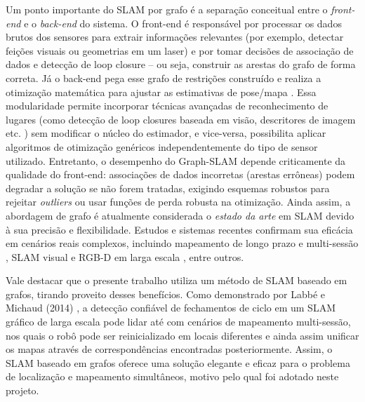         Um ponto importante do SLAM por grafo é a separação conceitual entre o \textit{front-end} e o \textit{back-end} do sistema. O front-end é responsável por processar os dados brutos dos sensores para extrair informações relevantes (por exemplo, detectar feições visuais ou geometrias em um laser) e por tomar decisões de associação de dados e detecção de loop closure – ou seja, construir as arestas do grafo de forma correta. Já o back-end pega esse grafo de restrições construído e realiza a otimização matemática para ajustar as estimativas de pose/mapa \cite{Cadena2016}. Essa modularidade permite incorporar técnicas avançadas de reconhecimento de lugares (como detecção de loop closures baseada em visão, descritores de imagem etc. \cite{Labbe2014}) sem modificar o núcleo do estimador, e vice-versa, possibilita aplicar algoritmos de otimização genéricos independentemente do tipo de sensor utilizado. Entretanto, o desempenho do Graph-SLAM depende criticamente da qualidade do front-end: associações de dados incorretas (arestas errôneas) podem degradar a solução se não forem tratadas, exigindo esquemas robustos para rejeitar \textit{outliers} ou usar funções de perda robusta na otimização. Ainda assim, a abordagem de grafo é atualmente considerada o \textit{estado da arte} em SLAM devido à sua precisão e flexibilidade. Estudos e sistemas recentes confirmam sua eficácia em cenários reais complexos, incluindo mapeamento de longo prazo e multi-sessão \cite{Labbe2014}, SLAM visual e RGB-D em larga escala \cite{MurArtal2017}\cite{Zhang2021}, entre outros. 
        
        Vale destacar que o presente trabalho utiliza um método de SLAM baseado em grafos, tirando proveito desses benefícios. Como demonstrado por Labbé e Michaud (2014) \cite{Labbe2014}, a detecção confiável de fechamentos de ciclo em um SLAM gráfico de larga escala pode lidar até com cenários de mapeamento multi-sessão, nos quais o robô pode ser reinicializado em locais diferentes e ainda assim unificar os mapas através de correspondências encontradas posteriormente. Assim, o SLAM baseado em grafos oferece uma solução elegante e eficaz para o problema de localização e mapeamento simultâneos, motivo pelo qual foi adotado neste projeto. 

